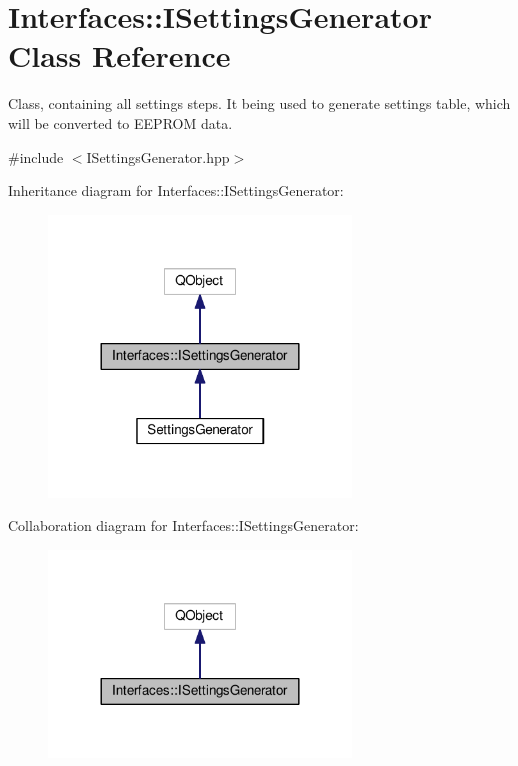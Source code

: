 \hypertarget{class_interfaces_1_1_i_settings_generator}{}\section{Interfaces\+:\+:I\+Settings\+Generator Class Reference}
\label{class_interfaces_1_1_i_settings_generator}


Class, containing all settings steps. It being used to generate settings table, which will be converted to E\+E\+P\+R\+OM data.  




{\ttfamily \#include $<$I\+Settings\+Generator.\+hpp$>$}



Inheritance diagram for Interfaces\+:\+:I\+Settings\+Generator\+:\nopagebreak
\begin{figure}[H]
\begin{center}
\leavevmode
\includegraphics[width=228pt]{class_interfaces_1_1_i_settings_generator__inherit__graph}
\end{center}
\end{figure}


Collaboration diagram for Interfaces\+:\+:I\+Settings\+Generator\+:\nopagebreak
\begin{figure}[H]
\begin{center}
\leavevmode
\includegraphics[width=228pt]{class_interfaces_1_1_i_settings_generator__coll__graph}
\end{center}
\end{figure}

